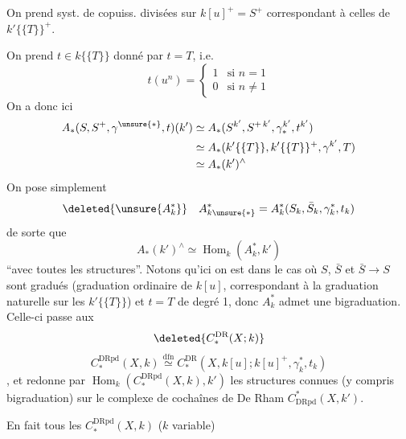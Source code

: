 On prend syst. de copuiss. divisées sur $k[u]^+=S^+$ correspondant à celles  de $k'\{\{T\}\}^+$.

On prend $t\in k\{\{T\}\}$ donné par $t=T$, i.e.
\[
 t(u^n)=\left\{\begin{array}{ll}1&\text{si }n=1\\0&\text{si }n\neq1\end{array}\right.
\]
On a donc ici
\[
\begin{aligned}
 A_*(S,S^+,\gamma^{\unsure{*}},t)(k')
 &\simeq A_*(S^{k'},S^{+\,k'},\gamma_*^{k'},t^{k'})\\
 &\simeq A_*(k'\{\{T\}\},k'\{\{T\}\}^+,\gamma^{k'},T)\\
 &\simeq A_*(k')^\wedge
\end{aligned}
\]
On pose simplement
\[
 \deleted{\unsure{A_k^*}}\quad A_{k\unsure{*}}^*=A_k^*(S_k,\bar S_k,\gamma_k^*,t_k)
\]
de sorte que
\[
 A_*(k')^\wedge\simeq\operatorname{Hom}_k(A_k^*,k')
\]
``avec toutes les structures''. Notons qu'ici on est dans le cas où $S$, $\bar S$ et $\bar S\longrightarrow S$ sont gradués (graduation ordinaire de $k[u]$, correspondant à la graduation naturelle sur les $k'\{\{T\}\}$) et $t=T$ de  degré 1, donc  $A_k^*$ admet une bigraduation. Celle-ci passe aux 
\[
 \deleted{C_*^{\mathrm{DR}}(X;k)}
\]
\[
 C_*^{\mathrm{DRpd}}(X,k)\overset{\mathrm{dfn}}\simeq C_*^{\mathrm{DR}}(X,k[u];k[u]^+,\gamma_k^*,t_k)
\]
, et redonne par $\operatorname{Hom}_k(C_*^{\mathrm{DRpd}}(X,k),k')$ les structures connues (y compris bigraduation) sur le complexe de cochaînes de De Rham $C^*_{\mathrm{DRpd}}(X,k')$.

En fait tous les $C_*^{\mathrm{DRpd}}(X,k)$ ($k$ variable)
